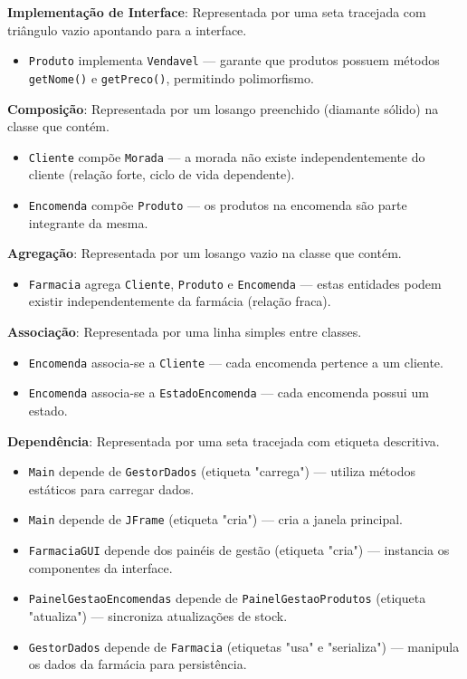 \documentclass[a4paper,12pt]{article}
\begin{document}
\textbf{Implementação de Interface}: Representada por uma seta tracejada com triângulo vazio apontando para a interface.
\begin{itemize}
    \item \texttt{Produto} implementa \texttt{Vendavel} — garante que produtos possuem métodos \texttt{getNome()} e \texttt{getPreco()}, permitindo polimorfismo.
\end{itemize}

\textbf{Composição}: Representada por um losango preenchido (diamante sólido) na classe que contém.
\begin{itemize}
    \item \texttt{Cliente} compõe \texttt{Morada} — a morada não existe independentemente do cliente (relação forte, ciclo de vida dependente).
    \item \texttt{Encomenda} compõe \texttt{Produto} — os produtos na encomenda são parte integrante da mesma.
\end{itemize}

\textbf{Agregação}: Representada por um losango vazio na classe que contém.
\begin{itemize}
    \item \texttt{Farmacia} agrega \texttt{Cliente}, \texttt{Produto} e \texttt{Encomenda} — estas entidades podem existir independentemente da farmácia (relação fraca).
\end{itemize}

\textbf{Associação}: Representada por uma linha simples entre classes.
\begin{itemize}
    \item \texttt{Encomenda} associa-se a \texttt{Cliente} — cada encomenda pertence a um cliente.
    \item \texttt{Encomenda} associa-se a \texttt{EstadoEncomenda} — cada encomenda possui um estado.
\end{itemize}

\textbf{Dependência}: Representada por uma seta tracejada com etiqueta descritiva.
\begin{itemize}
    \item \texttt{Main} depende de \texttt{GestorDados} (etiqueta "carrega") — utiliza métodos estáticos para carregar dados.
    \item \texttt{Main} depende de \texttt{JFrame} (etiqueta "cria") — cria a janela principal.
    \item \texttt{FarmaciaGUI} depende dos painéis de gestão (etiqueta "cria") — instancia os componentes da interface.
    \item \texttt{PainelGestaoEncomendas} depende de \texttt{PainelGestaoProdutos} (etiqueta "atualiza") — sincroniza atualizações de stock.
    \item \texttt{GestorDados} depende de \texttt{Farmacia} (etiquetas "usa" e "serializa") — manipula os dados da farmácia para persistência.
\end{itemize}
\end{document}
